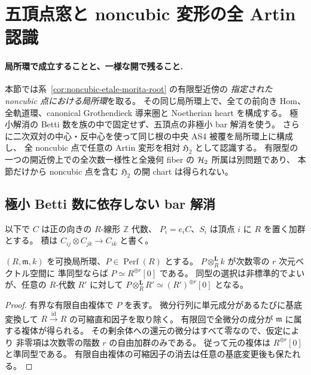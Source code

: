 \section{五頂点窓と noncubic 変形の全 Artin 認識}
\label{sec:noncubic-local-tails}

\paragraph{局所環で成立することと、一様な開で残ること.}
本節では系~\ref{cor:noncubic-etale-morita-root} の有限型近傍の
\emph{指定された noncubic 点における局所環}を取る。
その同じ局所環上で、全ての前向き Hom、全軌道環、canonical
Grothendieck 導来圏と Noetherian heart を構成する。
極小解消の Betti 数を族の中で固定せず、五頂点の非極小 bar 解消を使う。
さらに二次双対の中心・反中心を使って同じ根の中央 AS4 被覆を局所環上に構成し、
全 noncubic 点で任意の Artin 変形を相対 $\mathfrak H_2$ として認識する。
有限型の一つの開近傍上での全次数一様性と全幾何 fiber の $\mathcal H_2$ 所属は別問題であり、
本節だけから noncubic 点を含む $\mathfrak H_2$ の開 chart は得られない。

\subsection{極小 Betti 数に依存しない bar 解消}

以下で $C$ は正の向きの $R$-線形 $\mathbb Z$ 代数、
$P_i=e_iC$、$S_i$ は頂点 $i$ に $R$ を置く加群とする。
積は $C_{ij}\otimes C_{jk}\to C_{ik}$ と書く。

\begin{lemma}
\label{lem:local-perfect-fibre-concentration}
$(R,\mathfrak m,k)$ を可換局所環、$P\in\operatorname{Perf}(R)$ とする。
$P\otimes_R^{\mathbf L}k$ が次数零の $r$ 次元ベクトル空間に
準同型ならば $P\simeq R^{\oplus r}[0]$ である。
同型の選択は非標準的でよいが、任意の $R$-代数 $R'$ に対して
$P\otimes_R^{\mathbf L}R'\simeq (R')^{\oplus r}[0]$ となる。
\end{lemma}
\begin{proof}
有界な有限自由複体で $P$ を表す。
微分行列に単元成分があるたびに基底変換して
$R\xrightarrow{\mathrm{id}}R$ の可縮直和因子を取り除く。
有限回で全微分の成分が $\mathfrak m$ に属する複体が得られる。
その剰余体への還元の微分はすべて零なので、仮定により
非零項は次数零の階数 $r$ の自由加群のみである。
従って元の複体は $R^{\oplus r}[0]$ と準同型である。
有限自由複体の可縮因子の消去は任意の基底変更後も保たれる。
\end{proof}

